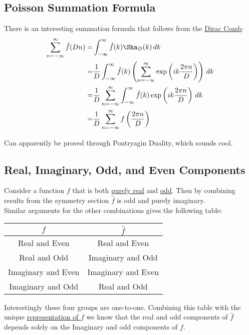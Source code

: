 \documentclass[12pt]{report}
\begin{document}
\subsection{Poisson Summation Formula}
There is an interesting summation formula that follows from the \hyperref[appx:dirac-comb]{Dirac Comb}:
\begin{equation*}
\begin{aligned}
	\sum_{n=-\infty}^{\infty}\hat{f}(Dn) = & \int_{-\infty}^{\infty}\hat{f}(k)\Sha_D(k)\,dk \\
	= &\frac{1}{D} \int_{-\infty}^{\infty}\hat{f}(k)\left(\sum_{n=-\infty}^{\infty}\exp\left(ik \frac{2\pi n}{D}\right)\right)\,dk\\
	= &\frac{1}{D} \sum_{n=-\infty}^{\infty}\int_{-\infty}^{\infty}\hat{f}(k)\exp\left(ik \frac{2\pi n}{D}\right)\,dk\\
	= &\frac{1}{D} \sum_{n=-\infty}^{\infty}f\left(\frac{2\pi n}{D}\right)\\
\end{aligned}
\end{equation*}

Can apparently be proved through Pontryagin Duality, which sounds cool. 

\subsection{Real, Imaginary, Odd, and Even Components}
Consider a function $f$ that is both \hyperref[sec:conjugation-sym]{purely real} and \hyperref[sec:parity-sym]{odd}.
Then by combining results from the symmetry section $\hat{f}$ is odd and purely imaginary.
\\

Similar arguments for the other combinations gives the following table:

\begin{center}
\begin{tabular}{c|c}
	$f$ & $\hat{f}$ \\ \hline
	Real and Even & Real and Even \\
	Real and Odd & Imaginary and Odd \\
	Imaginary and Even & Imaginary and Even \\
	Imaginary and Odd & Real and Odd \\
\end{tabular}
\end{center}

Interestingly these four groups are one-to-one.
Combining this table with the unique \hyperref[appx:real-img-odd-even]{representation of $f$} we know that the real and odd components of $\hat{f}$ depends solely on the Imaginary and odd components of $f$.
\end{document}
